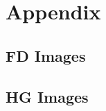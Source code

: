 \documentclass[10pt,twocolumn,letterpaper]{article}
\begin{document}
\clearpage

{\small


}

\section{Appendix}
\subsection{FD Images}
\label{apx:fd}
\subsection{HG Images}
\label{apx:hg}
\end{document}
